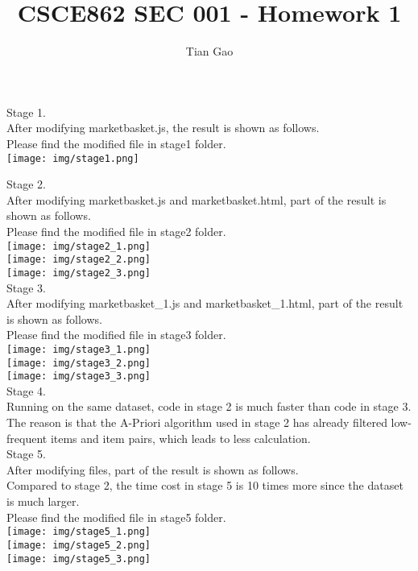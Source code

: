 \documentclass[a4paper]{article}
\title{CSCE862 SEC 001 - Homework 1}
\author{Tian Gao}
\begin{document}
\maketitle

Stage 1.\\
After modifying marketbasket.js, the result is shown as follows. \\
Please find the modified file in stage1 folder.\\
\texttt{[image: img/stage1.png]}

Stage 2.\\
After modifying marketbasket.js and marketbasket.html, part of the result is shown as follows. \\
Please find the modified file in stage2 folder.\\
\texttt{[image: img/stage2\_1.png]}\\
\texttt{[image: img/stage2\_2.png]}\\
\texttt{[image: img/stage2\_3.png]}\\

Stage 3.\\
After modifying marketbasket\_1.js and marketbasket\_1.html, part of the result is shown as follows. \\
Please find the modified file in stage3 folder.\\
\texttt{[image: img/stage3\_1.png]}\\
\texttt{[image: img/stage3\_2.png]}\\
\texttt{[image: img/stage3\_3.png]}\\

Stage 4.\\
Running on the same dataset, code in stage 2 is much faster than code in stage 3.\\
The reason is that the A-Priori algorithm used in stage 2 has already filtered low-frequent 
items and item pairs, which leads to less calculation.\\

Stage 5.\\
After modifying files, part of the result is shown as follows. \\
Compared to stage 2, the time cost in stage 5 is 10 times more since the dataset is much larger.\\
Please find the modified file in stage5 folder.\\
\texttt{[image: img/stage5\_1.png]}\\
\texttt{[image: img/stage5\_2.png]}\\
\texttt{[image: img/stage5\_3.png]}\\
\end{document}
